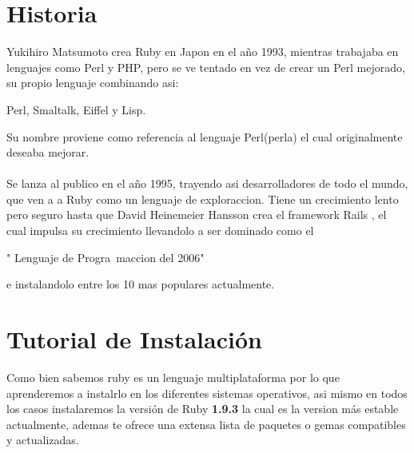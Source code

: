 \documentclass[11pt]{article} %
\begin{document}
\section{\fontsize{16}{0} \bf Historia}
Yukihiro Matsumoto crea  Ruby  en Japon en el año 1993, mientras trabajaba en lenguajes como Perl y PHP, pero se ve tentado en vez de crear un Perl mejorado,  su propio lenguaje combinando asi: \begin{bf}
Perl, Smaltalk, Eiffel y Lisp.
\end{bf} Su nombre proviene como referencia al lenguaje Perl(perla) el cual originalmente deseaba mejorar.\\ \\Se lanza al publico en el año 1995, trayendo asi desarrolladores de todo el mundo, que ven a a Ruby como un lenguaje de exploraccion. Tiene un crecimiento lento pero seguro hasta que David Heinemeier Hansson crea el framework Rails , el cual impulsa su crecimiento llevandolo a ser dominado como el
\begin{bf}
" Lenguaje de Progra~maccion del 2006" 
\end{bf} e instalandolo entre los 10 mas populares actualmente.

\section{\fontsize{16}{0} \bf Tutorial de Instalación}

Como bien sabemos ruby es un lenguaje multiplataforma por lo que aprenderemos a instalrlo en los diferentes sistemas operativos, asi mismo en todos los casos instalaremos la versión de Ruby {\bf 1.9.3} la cual es la version más estable actualmente, ademas te ofrece una extensa lista de paquetes o gemas compatibles y actualizadas.
\end{document}
